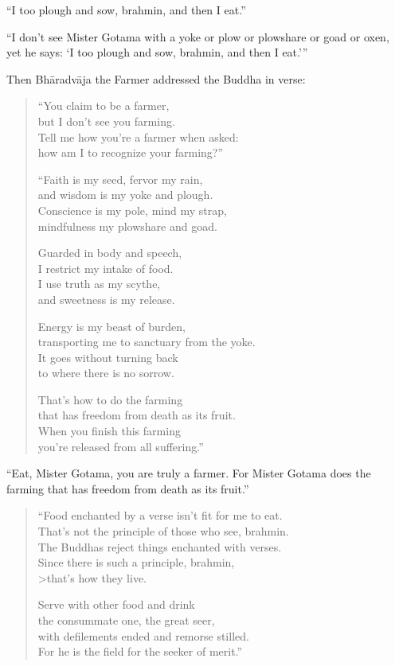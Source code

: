 \documentclass[12pt,openany]{book}%
\begin{document}
“I too plough and sow, brahmin, and then I eat.” 

“I don’t see Mister Gotama with a yoke or plow or plowshare or goad or oxen, yet he says: ‘I too plough and sow, brahmin, and then I eat.’” 

Then \textsanskrit{Bhāradvāja} the Farmer addressed the Buddha in verse: 

\begin{verse}%
“You claim to be a farmer, \\
but I don’t see you farming. \\
Tell me how you’re a farmer when asked: \\
how am I to recognize your farming?” 

“Faith is my seed, fervor my rain, \\
and wisdom is my yoke and plough. \\
Conscience is my pole, mind my strap, \\
mindfulness my plowshare and goad. 

Guarded in body and speech, \\
I restrict my intake of food. \\
I use truth as my scythe, \\
and sweetness is my release. 

Energy is my beast of burden, \\
transporting me to sanctuary from the yoke. \\
It goes without turning back \\
to where there is no sorrow. 

That’s how to do the farming \\
that has freedom from death as its fruit. \\
When you finish this farming \\
you’re released from all suffering.” 

%
\end{verse}

“Eat, Mister Gotama, you are truly a farmer. For Mister Gotama does the farming that has freedom from death as its fruit.” 

\begin{verse}%
“Food enchanted by a verse isn’t fit for me to eat. \\
That’s not the principle of those who see, brahmin. \\
The Buddhas reject things enchanted with verses. \\
Since there is such a principle, brahmin, \\>that’s how they live. 

Serve with other food and drink \\
the consummate one, the great seer, \\
with defilements ended and remorse stilled. \\
For he is the field for the seeker of merit.” 

%
\end{verse}
\end{document}
